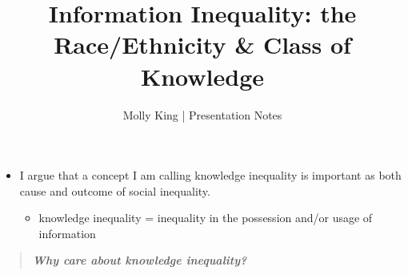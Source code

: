 \documentclass[]{article}
\begin{document}
 \title{\vspace{-1.0cm}Information Inequality: the Race/Ethnicity \& Class of Knowledge}
 \date{}
 \author{Molly King  |  Presentation Notes}

 \maketitle

\begin{itemize}
  \item{I argue that a concept I am calling knowledge inequality is important as both cause and outcome of social inequality.}
    \begin{itemize}
      \item{knowledge inequality = inequality in the possession and/or usage of information}
    \end{itemize}
\end{itemize}



\begin{quote}
  \emph{\textbf{Why care about knowledge inequality?}}
\end{quote}



\end{document}

